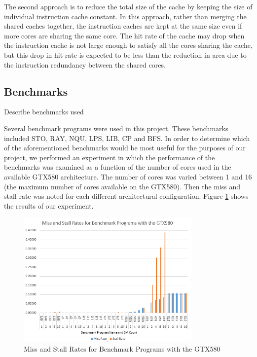 The second approach is to reduce the total size of the cache by
keeping the size of individual instruction cache constant. 
In this approach, rather than merging the shared caches together, the
instruction caches are kept at the same size even if more cores are
sharing the same core. 
The hit rate of the cache may drop when the instruction cache is not
large enough to satisfy all the cores sharing the cache, but this drop
in hit rate is expected to be less than the reduction in area due to
the instruction redundancy between the shared cores.


\subsection{Benchmarks}
Describe benchmarks used 

Several benchmark programs were used in this project. 
These benchmarks included STO, RAY, NQU, LPS, LIB, CP and BFS. 
In order to determine which of the aforementioned benchmarks would be
most useful for the purposes of our project, we performed an
experiment in which the performance of the benchmarks was examined as
a function of the number of cores used in the available GTX580
architecture. 
The number of cores was varied between 1 and 16 (the maximum number of
cores available on the GTX580). 
Then the miss and stall rate was noted for each different
architectural configuration. 
Figure \ref{fig:missStalls} shows the results of our experiment. 

\begin{figure}[b!]
\centering
\includegraphics[width=90mm]{graphics/miss_stalls_benchmarks.png}
\caption{Miss and Stall Rates for Benchmark Programs with the GTX580
}
\label{fig:missStalls}
\end{figure}

